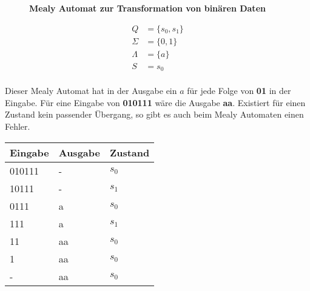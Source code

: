 \begin{figure}[h]
    \centering
    \caption*{\textbf{Mealy Automat zur Transformation von binären Daten}}
\end{figure}

\vspace*{-2cm}

\Large
\begin{align*}
    Q & = \{s_0, s_1\} \\
    \Sigma & = \{0, 1\} \\
    \Lambda & = \{a\} \\
    S & = s_0 \\
\end{align*}
\normalsize

Dieser Mealy Automat hat in der Ausgabe ein $a$ für jede Folge von \textbf{01} in
der Eingabe. Für eine Eingabe von \textbf{010111} wäre die Ausgabe \textbf{aa}.
Existiert für einen Zustand kein passender Übergang, so gibt es auch beim Mealy Automaten
einen Fehler.

\begin{table}[h]
    \begin{tabular}{|l|l|l|}
    \hline
    Eingabe & Ausgabe & Zustand \\ \hline
    010111 & - & $s_0$ \\ \hline
    10111 & - & $s_1$ \\ \hline
    0111 & a & $s_0$ \\ \hline
    111 & a & $s_1$ \\ \hline
    11 & aa & $s_0$ \\ \hline
    1 & aa & $s_0$ \\ \hline
    - & aa & $s_0$ \\ \hline
\end{tabular}
\end{table}